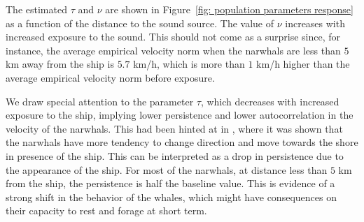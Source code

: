 \documentclass[aoas]{imsart}
\theoremstyle{definition}
\theoremstyle{remark}
\theoremstyle{remark}
\newcommand {\1}{\mathbb{1}}
\begin{document}
The estimated $\tau$ and $\nu$ are shown in Figure~\ref{fig: population parameters response} as a function of the distance to the sound source. The value of $\nu$ increases with increased exposure to the sound. This should not come as a surprise since, for instance, the average empirical velocity norm when the narwhals are less than $5$ km away from the ship is $5.7$ km/h, which is more than $1$ km/h higher than the average empirical velocity norm before exposure. 

We draw special attention to the parameter $\tau$, which decreases with increased exposure to the ship, implying lower persistence and lower autocorrelation in the velocity of the narwhals. This had been hinted at in \citep{heide-jorgensen_behavioral_2021}, where it was shown that the narwhals have more tendency to change direction and move towards the shore in presence of the ship. This can be interpreted as a drop in persistence due to the appearance of the ship. For most of the narwhals, at distance less than $5$ km from the ship, the persistence is half the baseline value. This is evidence of a strong shift in the behavior of the whales, which might have consequences on their capacity to rest and forage at short term.
\end{document}
